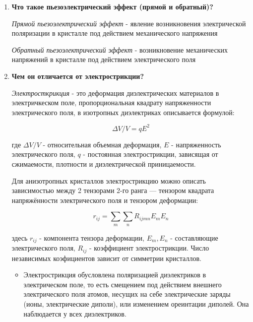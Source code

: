 \documentclass[a4paper]{article}
\begin{document}
\begin{enumerate}
    
    \item \textbf{Что такое пьезоэлектрический эффект (прямой и обратный)?} \par 
    
    \textit{Прямой пьезоэлектрический эффект} - явление возникновения электрической поляризации в кристалле под действием механического напряжения \par
    \textit{Обратный пьезоэлектрический эффект} - возникновение механических напряжений в кристалле под действием электрического поля


    \item \textbf{Чем он отличается от электрострикции?} \par 

    \textit{Электросткрикция} - это деформация диэлектрических материалов в электричкеском поле, пропорциональная квадрату напряженности электрического поля,
    в изотропных диэлектриках описывается формулой:

    \begin{equation}
        \Delta V / V = q E^2
    \end{equation}

    где $\Delta V/ V$ - относительная объемная деформация, $E$ - напряженность электрического поля, $q$ - постоянная электрострикции,
    зависящая от сжимаемости, плотности и диэлектрической приницаемости.

    Для анизотропных кристаллов электрострикцию можно описать зависимостью между 2 тензорами 2-го ранга — тензором квадрата напряжённости электрического поля и тензором деформации:

    \begin{equation}
        r_{ij} = \sum\limits_m \sum\limits_n R_{ijmn} E_m E_n
    \end{equation}

    здесь $r_{ij}$ - компонента тензора деформации, $E_m, E_n$ - составляющие электрического поля, $R_{ij}$ - коэффициент электрострикции. Число независимых коэфициентов зависит от симметрии кристаллов. 

    \begin{itemize}
        \item Электрострикция обусловлена поляризацией диэлектриков в электрическом поле, то есть смещением под действием 
        внешнего электрического поля атомов, несущих на себе электрические заряды (ионы, электрические диполи), или изменением ореинтации диполей.
        Она наблюдается у всех диэлектриков.


\end{itemize}
\end{enumerate}
\end{document}
